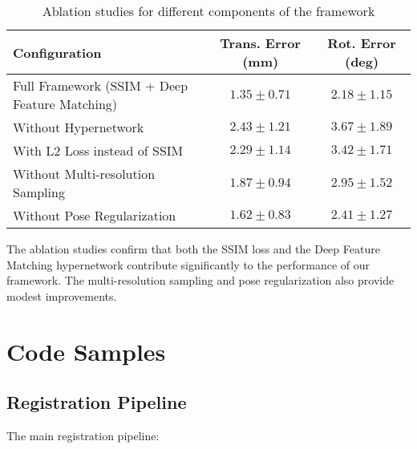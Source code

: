 \begin{table}[h]
\centering
\caption{Ablation studies for different components of the framework}
\label{tab:ablation}
\begin{tabular}{lcc}
\toprule
\textbf{Configuration} & \textbf{Trans. Error (mm)} & \textbf{Rot. Error (deg)} \\
\midrule
Full Framework (SSIM + Deep Feature Matching) & $1.35 \pm 0.71$ & $2.18 \pm 1.15$ \\
Without Hypernetwork & $2.43 \pm 1.21$ & $3.67 \pm 1.89$ \\
With L2 Loss instead of SSIM & $2.29 \pm 1.14$ & $3.42 \pm 1.71$ \\
Without Multi-resolution Sampling & $1.87 \pm 0.94$ & $2.95 \pm 1.52$ \\
Without Pose Regularization & $1.62 \pm 0.83$ & $2.41 \pm 1.27$ \\
\bottomrule
\end{tabular}
\end{table}

The ablation studies confirm that both the SSIM loss and the Deep Feature Matching hypernetwork contribute significantly to the performance of our framework. The multi-resolution sampling and pose regularization also provide modest improvements.

\section{Code Samples}

\subsection{Registration Pipeline}
The main registration pipeline:

